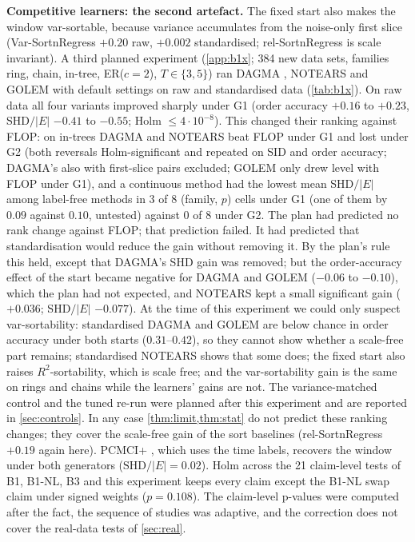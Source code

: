 \documentclass[pdflatex,sn-apa]{sn-jnl}
\theoremstyle{thmstyleone}
\theoremstyle{thmstylethree}
\theoremstyle{thmstyletwo}
\begin{document}
\textbf{Competitive learners: the second artefact.} The fixed start also
makes the window var-sortable, because variance accumulates from the
noise-only first slice (Var-SortnRegress $+0.20$ raw, $+0.002$ standardised;
rel-SortnRegress is scale invariant). A third planned experiment
(\cref{app:b1x}; 384 new data sets, families ring, chain, in-tree, ER($c{=}2$),
$T\in\{3,5\}$) ran DAGMA \citep{bello2022dagma}, NOTEARS
\citep{zheng2018notears} and GOLEM \citep{ng2020golem} with default settings on
raw and standardised data (\cref{tab:b1x}). On raw data all four variants
improved sharply under G1 (order accuracy $+0.16$ to $+0.23$, SHD$/|E|$ $-0.41$
to $-0.55$; Holm $\le4\cdot10^{-8}$). This
changed their ranking against FLOP: on in-trees DAGMA and NOTEARS beat FLOP
under G1 and lost under G2 (both reversals Holm-significant and repeated on
SID and order accuracy; DAGMA's also with first-slice pairs excluded; GOLEM
only drew level with FLOP under G1), and a continuous method had the lowest
mean SHD$/|E|$ among label-free methods in 3 of 8 (family, $p$) cells under G1
(one of them by $0.09$ against $0.10$, untested) against 0 of 8 under G2. The
plan had predicted no rank change against FLOP; that prediction failed. It
had predicted that standardisation would reduce the gain without removing it.
By the plan's rule this held, except that DAGMA's SHD gain was removed; but
the order-accuracy effect of the start became negative for DAGMA and GOLEM
($-0.06$ to $-0.10$), which the plan had not expected, and NOTEARS kept a small
significant gain ($+0.036$; SHD$/|E|$ $-0.077$). At the time of this experiment we could only suspect var-sortability:
standardised DAGMA and GOLEM are below chance in order accuracy under both
starts ($0.31$--$0.42$), so they cannot show whether a scale-free part remains;
standardised NOTEARS shows that some does; the fixed start also raises
$R^2$-sortability, which is scale free; and the var-sortability gain is the same
on rings and chains while the learners' gains are not. The variance-matched
control and the tuned re-run were planned after this experiment and are reported
in \cref{sec:controls}. In
any case \cref{thm:limit,thm:stat} do not predict these ranking changes; they
cover the scale-free gain of the sort baselines (rel-SortnRegress $+0.19$
again here). PCMCI+ \citep{runge2020pcmciplus}, which uses the time labels,
recovers the window under both generators ($\mathrm{SHD}/|E|=0.02$).
Holm across the 21 claim-level tests of B1, B1-NL, B3 and this experiment
keeps every claim except the B1-NL swap claim under signed weights ($p=0.108$).
The claim-level p-values were computed after the fact, the sequence of studies
was adaptive, and the correction does not cover the real-data tests of
\cref{sec:real}.
\end{document}
